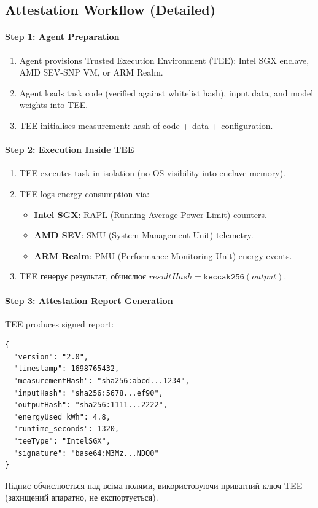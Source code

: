 \documentclass[11pt]{article}
\begin{document}
\subsection{Attestation Workflow (Detailed)}
\label{sec:attestation-workflow}
\paragraph{Step 1: Agent Preparation}
\begin{enumerate}[noitemsep]
  \item Agent provisions Trusted Execution Environment (TEE): Intel SGX enclave, AMD SEV-SNP VM, or ARM Realm.
  \item Agent loads task code (verified against whitelist hash), input data, and model weights into TEE.
  \item TEE initialises measurement: hash of code + data + configuration.
\end{enumerate}

\paragraph{Step 2: Execution Inside TEE}
\begin{enumerate}[noitemsep]
  \item TEE executes task in isolation (no OS visibility into enclave memory).
  \item TEE logs energy consumption via:
    \begin{itemize}[noitemsep]
      \item \textbf{Intel SGX}: RAPL (Running Average Power Limit) counters.
      \item \textbf{AMD SEV}: SMU (System Management Unit) telemetry.
      \item \textbf{ARM Realm}: PMU (Performance Monitoring Unit) energy events.
    \end{itemize}
  \item TEE генерує результат, обчислює $resultHash = \texttt{keccak256}(output)$.
\end{enumerate}

\paragraph{Step 3: Attestation Report Generation}
TEE produces signed report:
\begin{verbatim}
{
  "version": "2.0",
  "timestamp": 1698765432,
  "measurementHash": "sha256:abcd...1234",
  "inputHash": "sha256:5678...ef90",
  "outputHash": "sha256:1111...2222",
  "energyUsed_kWh": 4.8,
  "runtime_seconds": 1320,
  "teeType": "IntelSGX",
  "signature": "base64:M3Mz...NDQ0"
}
\end{verbatim}
Підпис обчислюється над всіма полями, використовуючи приватний ключ TEE (захищений апаратно, не експортується).
\end{document}
